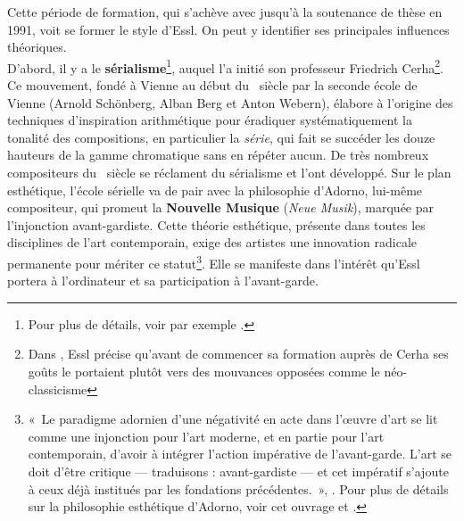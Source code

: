 \documentclass[a4paper,12pt]{article}
\newcommand{\guill}[1]{«~#1~»}
\begin{document}
Cette période de formation, qui s'achève avec jusqu'à la soutenance de thèse en 1991, voit se former le style d'Essl. On peut y identifier ses principales influences théoriques. \\
D'abord, il y a le \textbf{sérialisme}\footnote{Pour plus de détails, voir par exemple \cite{wodon2014histoire}.}, auquel l'a initié son professeur Friedrich Cerha\footnote{Dans \cite{pagano}, Essl précise qu'avant de commencer sa formation auprès de Cerha ses goûts le portaient plutôt vers des mouvances opposées comme le néo-classicisme}. Ce mouvement, fondé à Vienne au début du \XXe~siècle par la seconde école de Vienne (Arnold Schönberg, Alban Berg et Anton Webern), élabore à l'origine des techniques d'inspiration arithmétique pour éradiquer systématiquement la tonalité des compositions, en particulier la \emph{série}, qui fait se succéder les douze hauteurs de la gamme chromatique sans en répéter aucun. De très nombreux compositeurs du \XXe~siècle se réclament du sérialisme et l'ont développé. Sur le plan esthétique, l'école sérielle va de pair avec la philosophie d'Adorno, lui-même compositeur, qui promeut la \textbf{Nouvelle Musique} (\emph{Neue Musik}), marquée par l'injonction avant-gardiste. Cette théorie esthétique, présente dans toutes les disciplines de l'art contemporain, exige des artistes une innovation radicale permanente pour mériter ce statut\footnote{\guill{Le paradigme adornien d'une négativité en acte dans l'œuvre d'art se lit comme une injonction pour l'art moderne, et en partie pour l'art contemporain, d'avoir à intégrer l'action impérative de l'avant-garde. L'art se doit d'être critique --- traduisons : avant-gardiste --- et cet impératif s'ajoute à ceux déjà institués par les fondations précédentes.}, \cite{adorno1949philosophie}. Pour plus de détails sur la philosophie esthétique d'Adorno, voir cet ouvrage et \cite{adorno1989theorie}.}. Elle se manifeste dans l'intérêt qu'Essl portera à l'ordinateur et sa participation à l'avant-garde. \\
\end{document}
